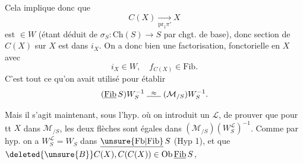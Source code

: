 Cela implique donc que
\[
C(X)\xrightarrow[\mathrm{pr}_1\pi']{}X
\]
est $\in W$ (étant déduit de $\sigma_S:\mathrm{Ch}(S)\longrightarrow S$ par chgt. de base), donc  section  de $C(X)$ sur $X$ est dans $i_X$. On a donc bien une factorisation, fonctorielle en $X$
avec
\[
i_X\in W,\quad f_{C(X)}\in\mathrm{Fib}\text{.}
\]
C'est tout ce qu'on avait utilisé pour établir
\[
(\underline{\mathrm{Fib}}\,S)W_S^{-1}\mathrel{\overset{\approx}{\rule{1.7em}{.4pt}}}(\mathcal M_{/S})W_S^{-1}\text{.}
\]

Mais il s'agit maintenant, sous l'hyp. où on introduit un $\mathcal L$, de prouver que pour tt $X$ dans $\mathcal M_{/S}$, les deux flèches
sont égales dans $(\mathcal M_{/S})(W_S^{\mathcal L})^{-1}$. Comme par hyp. on a $W_S^{\mathcal L}=W_S$ dans $\underline{\unsure{\mathrm{Fb}|\mathrm{Fib}}}\,S$ (Hyp 1), et que $\deleted{\unsure{B}}C(X),C(C(X))\in\mathrm{Ob}\,\underline{\mathrm{Fib}}\,S$,

